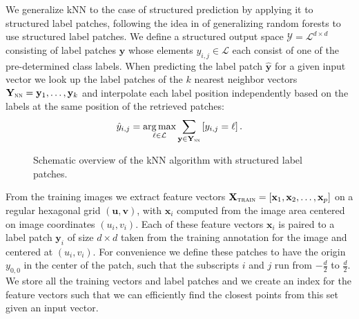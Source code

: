 \documentclass[a4paper,titlepage]{article}
\renewcommand{\vec}[1]{\mathbf{#1}}
\newcommand{\mat}[1]{\mathbf{#1}}
\DeclareMathOperator*{\argmax}{arg\,max}
\begin{document}
We generalize \ac{kNN} to the case of structured prediction by applying it to structured label patches, following the idea in \cite{kontschieder2011structured} of generalizing random forests to use structured label patches. We define a structured output space $\mathcal{Y} = \mathcal{L}^{d \times d}$ consisting of label patches $\vec{y}$ whose elements $y_{i,j} \in \mathcal{L}$ each consist of one of the pre-determined class labels. When predicting the label patch $\hat{\vec{y}}$ for a given input vector we look up the label patches of the $k$ nearest neighbor vectors $\mat{Y}_\textsc{nn} = {\vec{y}_1, \ldots, \vec{y}_k}$ and interpolate each label position independently based on the labels at the same position of the retrieved patches:
\begin{equation}
\hat{y}_{i,j} = \argmax_{\ell \in \mathcal{L}} \sum_{\vec{y} \in \mat{Y}_\textsc{nn}} \left[ y_{i,j} = \ell \right ].
\label{eq:nn_decision_rule}
\end{equation}

\begin{figure}[tbh]
\begin{center}
\caption{Schematic overview of the \ac{kNN} algorithm with structured label patches. }
\label{fig:knn_segmentation}
\end{center}
\end{figure}

From the training images we extract feature vectors $\mat{X}_\textsc{train} = \left [ \vec{x}_1, \vec{x}_2, \ldots, \vec{x}_p \right ]$ on a regular hexagonal grid $(\vec{u}, \vec{v})$, with $\vec{x}_i$ computed from the image area centered on image coordinates $(u_i, v_i)$. Each of these feature vectors $\vec{x}_i$ is paired to a label patch $\vec{y}_i$ of size $d \times d$ taken from the training annotation for the image and centered at $(u_i, v_i)$. For convenience we define these patches to have the origin $y_{0,0}$ in the center of the patch, such that the subscripts $i$ and $j$ run from $-\tfrac{d}{2}$ to $\tfrac{d}{2}$. We store all the training vectors and label patches and we create an index for the feature vectors such that we can efficiently find the closest points from this set given an input vector.
\end{document}
